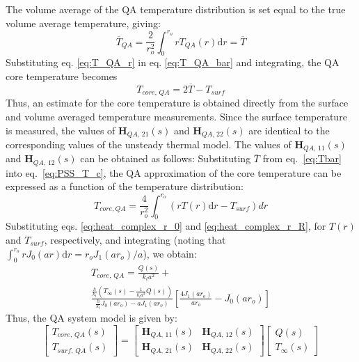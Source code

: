\documentclass[journal, english]{IEEEtran}
\begin{document}
The volume average of the QA temperature distribution is set equal to the true volume average temperature, giving:
\begin{equation}
\overline{T}_{QA}=\frac{2}{r_{o}^{2}}\int_{0}^{r_{o}}rT_{QA}(r)\mathrm{d}r=\overline{T}\label{eq:T_QA_bar}
\end{equation}
Substituting eq. \ref{eq:T_QA_r} in eq. \ref{eq:T_QA_bar} and integrating, the QA core temperature
becomes
\begin{equation}
T_{core,\, QA}=2\overline{T}-T_{surf}\label{eq:PSS_T_c}
\end{equation}
Thus, an estimate for the core temperature is obtained directly from
the surface and volume averaged temperature measurements.
Since the surface temperature is measured, the values of $\mathbf{H}_{QA,\,21}(s)$
and $\mathbf{H}_{QA,\,22}(s)$ are identical to the corresponding
values of the unsteady thermal model. The values of $\mathbf{H}_{QA,\,11}(s)$
and $\mathbf{H}_{QA,\,12}(s)$ can be obtained as follows: 
Substituting $\overline{T}$ from eq.\ \ref{eq:Tbar} into eq.\ \ref{eq:PSS_T_c}, the QA approximation of the core temperature can be expressed as a function of the temperature distribution:
\begin{equation}
T_{core,QA}=\frac{4}{r_{o}^{2}}\int_{0}^{r_{o}}\left(rT(r)\mathrm{d}r-T_{surf} \right) dr
\end{equation}
Substituting eqs. \ref{eq:heat_complex_r_0} and \ref{eq:heat_complex_r_R},
for $T(r)$ and $T_{surf}$, respectively, and integrating (noting
that $\int_{0}^{r_{o}}rJ_{0}(ar)\mathrm{d}r=r_{o}J_{1}(ar_{o})/a$),
we obtain:
\begin{multline}
T_{core,\, QA}=\frac{Q(s)}{k_{t}a^{2}}+\\
\frac{\frac{h}{k_{t}}(T_{\infty}(s)-\frac{1}{k_{t}a^{2}}Q(s))}{\frac{h}{k_{t}}J_{0}(ar_{o})-aJ_{1}(ar_{o})}\left[\frac{4J_{1}(ar_{o})}{ar_{o}}-J_{0}(ar_{o})\right]
\end{multline}
Thus, the QA system model is given by:
\begin{equation}
\begin{bmatrix}T_{core,\, QA}(s)\\
T_{surf,\, QA}(s)
\end{bmatrix}=\begin{bmatrix}\mathbf{H}_{QA,\,11}(s) & \mathbf{H}_{QA,\,12}(s)\\
\mathbf{H}_{QA,\,21}(s) & \mathbf{H}_{QA,\,22}(s)
\end{bmatrix}\begin{bmatrix}Q(s)\\
T_{\infty}(s)
\end{bmatrix}
\end{equation}
\end{document}
